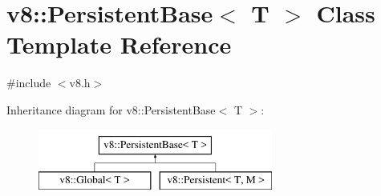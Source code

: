 \hypertarget{classv8_1_1PersistentBase}{\section{v8\-:\-:Persistent\-Base$<$ T $>$ Class Template Reference}
\label{classv8_1_1PersistentBase}
}


{\ttfamily \#include $<$v8.\-h$>$}

Inheritance diagram for v8\-:\-:Persistent\-Base$<$ T $>$\-:\begin{figure}[H]
\begin{center}
\leavevmode
\includegraphics[height=2.000000cm]{classv8_1_1PersistentBase}
\end{center}
\end{figure}
